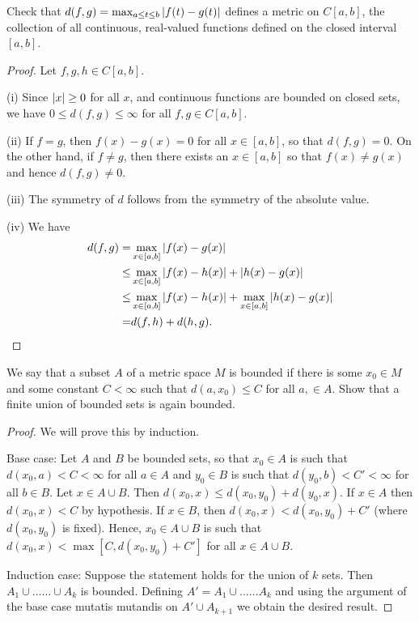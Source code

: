 \begin{exercise}{12}
Check that $d(f,g)=\max_{a\leq t\leq b}\left\lvert f(t)-g(t)\right\rvert$ defines a metric on $C[a,b]$, the collection of all continuous, real-valued functions defined on the closed interval $[a,b]$.
\end{exercise}
\begin{proof}
Let $f,g,h\in C[a,b]$.

(i) Since $\left\lvert x\right\rvert\geq 0$ for all $x$, and continuous functions are bounded on closed sets, we have $0\leq d(f,g)\leq \infty$ for all $f,g\in C[a,b]$.

(ii) If $f=g$, then $f(x)-g(x)=0$ for all $x\in[a,b]$, so that $d(f,g)=0$. On the other hand, if $f\neq g$, then there exists an $x\in[a,b]$ so that $f(x)\neq g(x)$ and hence $d(f,g)\neq 0$.

(iii) The symmetry of $d$ follows from the symmetry of the absolute value.

(iv) We have 
\begin{align*}
d(f,g) =& \max_{x\in[a,b]}\left\lvert f(x)-g(x)\right\rvert\\
\leq& \max_{x\in[a,b]}\left\lvert f(x)-h(x)\right\rvert
+\left\lvert h(x)-g(x)\right\rvert\\
\leq& \max_{x\in[a,b]}\left\lvert f(x)-h(x)\right\rvert
+\max_{x\in[a,b]}\left\lvert h(x)-g(x)\right\rvert\\
=& d(f,h)+d(h,g).
\end{align*}
\end{proof} 

\begin{exercise}{14}
We say that a subset $A$ of a metric space $M$ is bounded if there is some $x_0\in M$ and some constant $C<\infty$ such that $d(a,x_0)\leq C$ for all $a,\in A$. Show that a finite union of bounded sets is again bounded.
\end{exercise}
\begin{proof}
We will prove this by induction. 

Base case: Let $A$ and $B$ be bounded sets, so that $x_0\in A$ is such that $d(x_0,a)<C<\infty$ for all $a\in A$ and $y_0\in B$ is such that $d(y_0,b)<C'<\infty$ for all $b\in B$. Let $x\in A\cup B$. Then $d(x_0,x)\leq d(x_0,y_0)+d(y_0,x)$. If $x\in A$ then $d(x_0,x)<C$ by hypothesis. If $x\in B$, then $d(x_0,x)<d(x_0,y_0)+C'$ (where $d(x_0,y_0)$ is fixed). Hence, $x_0\in A\cup B$ is such that $d(x_0,x)<\max[C,d(x_0,y_0)+C']$ for all $x\in A\cup B$.

Induction case: Suppose the statement holds for the union of $k$ sets. Then $A_1\cup\dots\dots\cup A_k$ is bounded. Defining $A'=A_1\cup\dots\dots A_k$ and using the argument of the base case mutatis mutandis on $A'\cup A_{k+1}$ we obtain the desired result.
\end{proof} 

